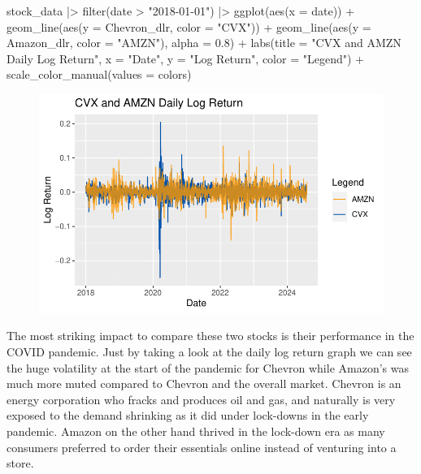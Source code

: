 \documentclass[
  letterpaper,
  DIV=11,
  numbers=noendperiod]{scrartcl}
\newenvironment{Shaded}{\begin{snugshade}}{\end{snugshade}}
\newcommand{\AttributeTok}[1]{\textcolor[rgb]{0.40,0.45,0.13}{#1}}
\newcommand{\FloatTok}[1]{\textcolor[rgb]{0.68,0.00,0.00}{#1}}
\newcommand{\FunctionTok}[1]{\textcolor[rgb]{0.28,0.35,0.67}{#1}}
\newcommand{\NormalTok}[1]{\textcolor[rgb]{0.00,0.23,0.31}{#1}}
\newcommand{\SpecialCharTok}[1]{\textcolor[rgb]{0.37,0.37,0.37}{#1}}
\newcommand{\StringTok}[1]{\textcolor[rgb]{0.13,0.47,0.30}{#1}}
\begin{document}
\begin{Shaded}
\begin{Highlighting}[]
\NormalTok{stock\_data }\SpecialCharTok{|\textgreater{}}
  \FunctionTok{filter}\NormalTok{(date }\SpecialCharTok{\textgreater{}} \StringTok{"2018{-}01{-}01"}\NormalTok{) }\SpecialCharTok{|\textgreater{}} 
  \FunctionTok{ggplot}\NormalTok{(}\FunctionTok{aes}\NormalTok{(}\AttributeTok{x =}\NormalTok{ date)) }\SpecialCharTok{+}
  \FunctionTok{geom\_line}\NormalTok{(}\FunctionTok{aes}\NormalTok{(}\AttributeTok{y =}\NormalTok{ Chevron\_dlr, }\AttributeTok{color =} \StringTok{"CVX"}\NormalTok{)) }\SpecialCharTok{+}
  \FunctionTok{geom\_line}\NormalTok{(}\FunctionTok{aes}\NormalTok{(}\AttributeTok{y =}\NormalTok{ Amazon\_dlr, }\AttributeTok{color =} \StringTok{"AMZN"}\NormalTok{), }\AttributeTok{alpha =} \FloatTok{0.8}\NormalTok{) }\SpecialCharTok{+}
  \FunctionTok{labs}\NormalTok{(}\AttributeTok{title =} \StringTok{"CVX and AMZN Daily Log Return"}\NormalTok{, }\AttributeTok{x =} \StringTok{"Date"}\NormalTok{, }\AttributeTok{y =} \StringTok{"Log Return"}\NormalTok{, }
       \AttributeTok{color =} \StringTok{"Legend"}\NormalTok{) }\SpecialCharTok{+}
  \FunctionTok{scale\_color\_manual}\NormalTok{(}\AttributeTok{values =}\NormalTok{ colors)}
\end{Highlighting}
\end{Shaded}

\begin{figure}[H]

{\centering \includegraphics{homework_1_files/figure-pdf/unnamed-chunk-14-1.pdf}

}

\end{figure}

The most striking impact to compare these two stocks is their
performance in the COVID pandemic. Just by taking a look at the daily
log return graph we can see the huge volatility at the start of the
pandemic for Chevron while Amazon's was much more muted compared to
Chevron and the overall market. Chevron is an energy corporation who
fracks and produces oil and gas, and naturally is very exposed to the
demand shrinking as it did under lock-downs in the early pandemic.
Amazon on the other hand thrived in the lock-down era as many consumers
preferred to order their essentials online instead of venturing into a
store.
\end{document}
